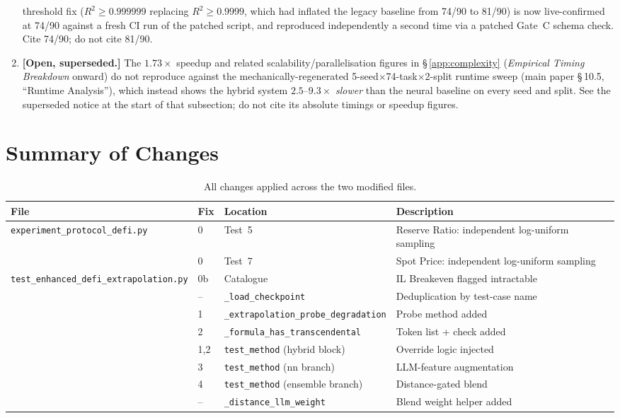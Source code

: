 \documentclass[twoside,11pt]{article}
\begin{document}
\begin{enumerate}[leftmargin=*]
    threshold fix ($R^2 \geq 0.999999$ replacing $R^2 \geq 0.9999$, which
    had inflated the legacy baseline from 74/90 to 81/90) is now
    live-confirmed at 74/90 against a fresh CI run of the patched script,
    and reproduced independently a second time via a patched Gate~C
    schema check. Cite 74/90; do not cite 81/90.
  \item \textbf{[Open, superseded.]} The $1.73\times$ speedup and related
    scalability/parallelisation figures in \S\,\ref{app:complexity}
    (\emph{Empirical Timing Breakdown} onward) do not reproduce against
    the mechanically-regenerated 5-seed$\times$74-task$\times$2-split
    runtime sweep (main paper \S\,10.5, ``Runtime Analysis''), which instead shows
    the hybrid system $2.5$--$9.3\times$ \emph{slower} than the neural
    baseline on every seed and split. See the superseded notice at the
    start of that subsection; do not cite its absolute timings or
    speedup figures.
\end{enumerate}

\section{Summary of Changes}
\label{sec:changes}

\begin{table}[h]
\centering
\caption{All changes applied across the two modified files.}
\label{tab:changes}
\begin{tabular}{llll}
\toprule
\textbf{File} & \textbf{Fix} & \textbf{Location} & \textbf{Description} \\
\midrule
\texttt{experiment\_protocol\_defi.py}
  & 0  & Test~5  & Reserve Ratio: independent log-uniform sampling \\
  & 0  & Test~7  & Spot Price: independent log-uniform sampling \\
\midrule
\texttt{test\_enhanced\_defi\_extrapolation.py}
  & 0b & Catalogue     & IL Breakeven flagged intractable \\
  & -- & \texttt{\_load\_checkpoint} & Deduplication by test-case name \\
  & 1  & \texttt{\_extrapolation\_probe\_degradation} & Probe method added \\
  & 2  & \texttt{\_formula\_has\_transcendental} & Token list + check added \\
  & 1,2& \texttt{test\_method} (hybrid block) & Override logic injected \\
  & 3  & \texttt{test\_method} (nn branch)     & LLM-feature augmentation \\
  & 4  & \texttt{test\_method} (ensemble branch) & Distance-gated blend \\
  & -- & \texttt{\_distance\_llm\_weight} & Blend weight helper added \\
\bottomrule
\end{tabular}
\end{table}
\end{document}
